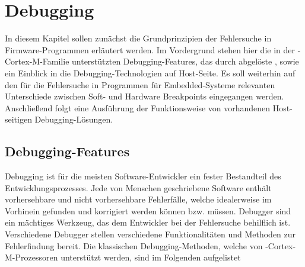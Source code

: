\section{Debugging}
\label{sec:debugging}
In diesem Kapitel sollen zunächst die Grundprinzipien der Fehlersuche in Firmware-Programmen erläutert werden. Im
Vordergrund stehen hier die in der -Cortex-M-Familie unterstützten Debugging-Features, das durch
 abgelöste , sowie ein Einblick in die Debugging-Technologien auf Host-Seite. Es soll
weiterhin auf den für die Fehlersuche in Programmen für Embedded-Systeme relevanten Unterschiede zwischen Soft- und
Hardware Breakpoints eingegangen werden.
Anschließend folgt eine Ausführung der Funktionsweise von vorhandenen Host-seitigen Debugging-Lösungen.
	\subsection{Debugging-Features}
	\label{sec:debugfeatures}
	Debugging ist für die meisten Software-Entwickler ein fester Bestandteil des Entwicklungsprozesses. Jede von
	Menschen geschriebene Software enthält vorhersehbare und nicht vorhersehbare Fehlerfälle, welche idealerweise
	im Vorhinein gefunden und korrigiert werden können bzw. müssen. Debugger sind ein mächtiges Werkzeug, das dem
	Entwickler bei der Fehlersuche behilflich ist.
	Verschiedene Debugger stellen verschiedene Funktionalitäten und Methoden zur Fehlerfindung bereit. Die klassischen
    Debugging-Methoden, welche von -Cortex-M-Prozessoren unterstützt werden, sind im Folgenden aufgelistet
